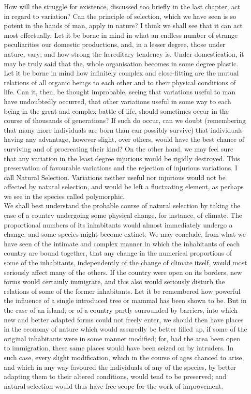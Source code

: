 \indent How will the struggle for existence, discussed too briefly in the last chapter, act in regard to variation?  Can the principle of selection, which we have seen is so potent in the hands of man, apply in nature? I think we shall see that it can act most effectually. Let it be borne in mind in what an endless number of strange peculiarities our domestic productions, and, in a lesser degree, those under nature, vary; and how strong the hereditary tendency is. Under domestication, it may be truly said that the, whole organisation becomes in some degree plastic. Let it be borne in mind how infinitely complex and close-fitting are the mutual relations of all organic beings to each other and to their physical conditions of life. Can it, then, be thought improbable, seeing that variations useful to man have undoubtedly occurred, that other variations useful in some way to each being in the great and complex battle of life, should sometimes occur in the course of thousands of generations?  If such do occur, can we doubt (remembering that many more individuals are born than can possibly survive) that individuals having any advantage, however slight, over others, would have the best chance of  surviving and of procreating their kind? On the other hand, we may feel sure that any variation in the least degree injurious would be rigidly destroyed. This preservation of favourable variations and the rejection of injurious variations, I call Natural Selection. Variations neither useful nor injurious would not be affected by natural selection, and would be left a fluctuating element, as perhaps we see in the species called polymorphic. \\
\indent We shall best understand the probable course of natural selection by taking the case of a country undergoing some physical change, for instance, of climate. The proportional numbers of its inhabitants would almost immediately undergo a change, and some species might become extinct. We may conclude, from what we have seen of the intimate and complex manner in which the inhabitants of each country are bound together, that any change in the numerical proportions of some of the inhabitants, independently of the change of climate itself, would most seriously affect many of the others. If the country were open on its borders, new forms would certainly immigrate, and this also would seriously disturb the relations of some of the former inhabitants. Let it be remembered how powerful the influence of a single introduced tree or mammal has been shown to be. But in the case of an island, or of a country partly surrounded by barriers, into which new and better adapted forms could not freely enter, we should then have places in the economy of nature which would assuredly be better filled up, if some of the original inhabitants were in some manner modified; for, had the area been open to immigration, these same places would have been seized on by intruders. In such case, every slight modification, which in the course of ages chanced to arise, and which in any way favoured the individuals of any of the species, by better adapting them to their altered conditions, would tend to be preserved; and natural selection would thus have free scope for the work of improvement. \\
